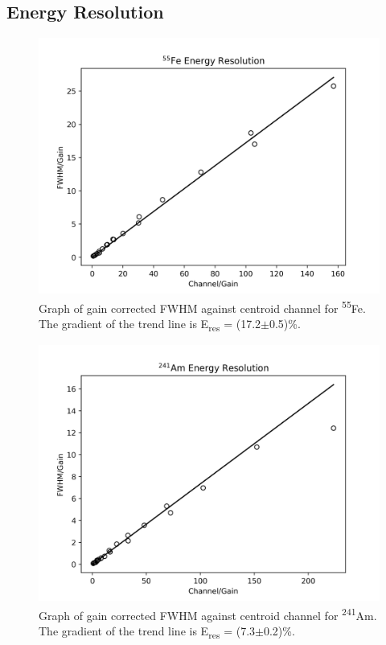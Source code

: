 \subsection{Energy Resolution}

\begin{figure}[H]
  \centering
  \includegraphics[width=12cm]{energyResolutionFe.png}
  \caption{Graph of gain corrected FWHM against centroid channel for \textsuperscript{55}Fe. The gradient of the trend line is E\textsubscript{res} = (17.2$\pm$0.5)\%.}
  \label{fig:energyResolutionFe}
\end{figure}

\begin{figure}[H]
  \centering
  \includegraphics[width=12cm]{energyResolutionAm.png}
  \caption{Graph of gain corrected FWHM against centroid channel for \textsuperscript{241}Am. The gradient of the trend line is E\textsubscript{res} = (7.3$\pm$0.2)\%.}
  \label{fig:energyResolutionAm}
\end{figure}

